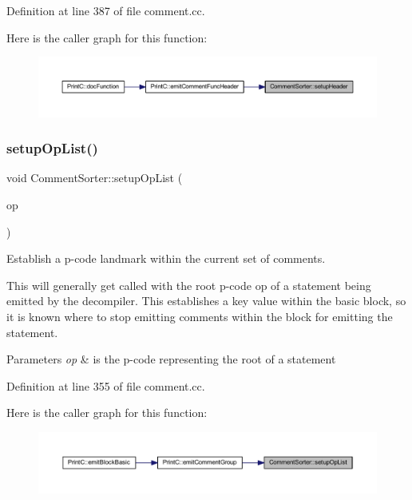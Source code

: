 Definition at line 387 of file comment.\+cc.

Here is the caller graph for this function\+:
\nopagebreak
\begin{figure}[H]
\begin{center}
\leavevmode
\includegraphics[width=350pt]{class_comment_sorter_a524cd5b7f4b5a6abb3aa63582b6f09c6_icgraph}
\end{center}
\end{figure}
\mbox{\label{class_comment_sorter_a37347c22d077831fef08a87ce951c2a2}} 
\subsubsection{\texorpdfstring{setupOpList()}{setupOpList()}}
{\footnotesize\ttfamily void Comment\+Sorter\+::setup\+Op\+List (\begin{DoxyParamCaption}\item[{const \mbox{\hyperlink{class_pcode_op}{Pcode\+Op}} $\ast$}]{op }\end{DoxyParamCaption})}



Establish a p-\/code landmark within the current set of comments. 

This will generally get called with the root p-\/code op of a statement being emitted by the decompiler. This establishes a key value within the basic block, so it is known where to stop emitting comments within the block for emitting the statement. 
\begin{DoxyParams}{Parameters}
{\em op} & is the p-\/code representing the root of a statement \\
\hline
\end{DoxyParams}


Definition at line 355 of file comment.\+cc.

Here is the caller graph for this function\+:
\nopagebreak
\begin{figure}[H]
\begin{center}
\leavevmode
\includegraphics[width=350pt]{class_comment_sorter_a37347c22d077831fef08a87ce951c2a2_icgraph}
\end{center}
\end{figure}


